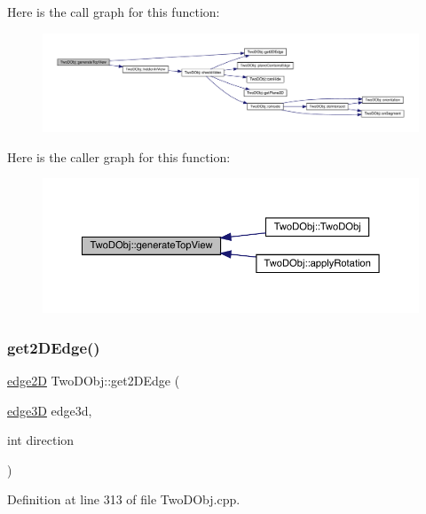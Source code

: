 Here is the call graph for this function\+:
\nopagebreak
\begin{figure}[H]
\begin{center}
\leavevmode
\includegraphics[width=350pt]{class_two_d_obj_a3e4e17ffd7b54bf442bfce6387ed4c27_cgraph}
\end{center}
\end{figure}
Here is the caller graph for this function\+:
\nopagebreak
\begin{figure}[H]
\begin{center}
\leavevmode
\includegraphics[width=350pt]{class_two_d_obj_a3e4e17ffd7b54bf442bfce6387ed4c27_icgraph}
\end{center}
\end{figure}
\mbox{\label{class_two_d_obj_a1cd226f2becc270af54e16265f9b3b55}} 
\subsubsection{\texorpdfstring{get2\+D\+Edge()}{get2DEdge()}}
{\footnotesize\ttfamily \mbox{\hyperlink{structedge2_d}{edge2D}} Two\+D\+Obj\+::get2\+D\+Edge (\begin{DoxyParamCaption}\item[{\mbox{\hyperlink{structedge3_d}{edge3D}}}]{edge3d,  }\item[{int}]{direction }\end{DoxyParamCaption})}



Definition at line 313 of file Two\+D\+Obj.\+cpp.

